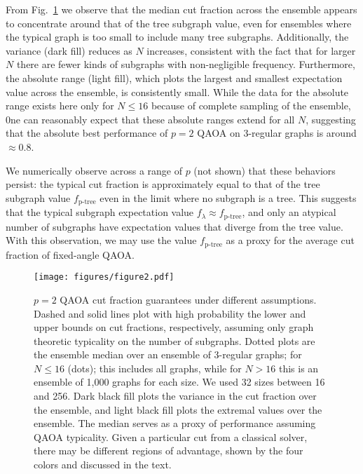 From Fig.~\ref{fig:bounds_p1} we observe that the median cut fraction across the ensemble appears to concentrate around that of the tree subgraph value, even for ensembles where the typical graph is too small to include many tree subgraphs. Additionally, the variance (dark fill) reduces as $N$ increases, consistent with the fact that for larger $N$ there are fewer kinds of subgraphs with non-negligible frequency. Furthermore, the absolute range (light fill), which plots the largest and smallest expectation value across the ensemble, is consistently small. While the data for the absolute range  exists  here only for $N\leq 16$ because of complete sampling of the ensemble, 0ne can reasonably  expect that these absolute ranges extend for all $N$, suggesting that the absolute best performance of $p=2$ QAOA on 3-regular graphs is around $\approx 0.8$.

We numerically observe across a range of $p$ (not shown) that these behaviors persist: the typical cut fraction is approximately equal to that of the tree subgraph value $f_\text{p-tree}$ even in the limit where no subgraph is a tree. This suggests that the typical subgraph expectation value $f_\lambda\approx f_\text{p-tree}$, and only an atypical number of subgraphs have expectation values that diverge from the tree value. With this observation, we may use the value $f_\text{p-tree}$ as a proxy for the average cut fraction of fixed-angle QAOA.

\quad


\begin{figure}
    \centering
    \texttt{[image: figures/figure2.pdf]}
    \caption{$p=2$ QAOA cut fraction guarantees under different assumptions. Dashed and solid lines plot with high probability the lower and upper bounds on cut fractions, respectively, assuming only graph theoretic typicality on the number of subgraphs. Dotted plots are the ensemble median over an ensemble of 3-regular graphs; for $N\leq 16$ (dots); this includes all graphs, while for $N>16$ this is an ensemble of 1,000 graphs for each size. We used 32 sizes between 16 and 256. Dark black fill plots the variance in the cut fraction over the ensemble, and light black fill plots the extremal values over the ensemble. The median serves as a proxy of performance assuming QAOA typicality. Given a particular cut from a classical solver, there may be different regions of advantage, shown by the four colors and discussed in the text.}
    \label{fig:bounds_p1}
\end{figure}


